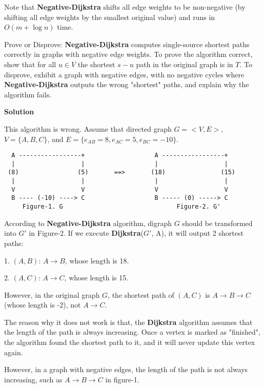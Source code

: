 \documentclass{article}
\newcounter{exercise}
\newcommand{\<}{
    \langle}
\renewcommand{\>}{
    \rangle}
\begin{document}
{\begin{exercise}
Note that \textbf{Negative-Dijkstra} shifts all edge weights to be non-negative
(by shifting all edge weights by the smallest original value) and runs in $O(m+\log n)$ time.

Prove or Disprove: \textbf{Negative-Dijkstra} computes single-source shortest paths correctly in graphs with negative edge weights. To prove the algorithm correct, show that for all $u\in V$ the shortest $s-u$ path in the original graph is in $T$. To disprove, exhibit a graph with negative edges, with no negative cycles where \textbf{Negative-Dijkstra} outputs the wrong "shortest" paths, and explain why the algorithm fails.
\end{exercise}

\bigskip
\noindent \textbf{Solution}

This algorithm is wrong. Assume that directed graph $G=<V, E>$, $V = \{A,B,C\}$, and $E = \{ e_{AB} = 8, e_{AC} = 5, e_{BC} = -10 \}$.

\begin{lstlisting}
  A -----------------+                   A -----------------+    
  |                  |                   |                  |
 (8)                (5)       ==>       (18)               (15)
  |                  |                   |                  |
  V                  V                   V                  V
  B ---- (-10) ----> C                   B ----- (0) -----> C
     Figure-1. G                               Figure-2. G'
\end{lstlisting}

According to \textbf{Negative-Dijkstra} algorithm, digraph $G$ should be transformed into $G'$ in Figure-2.
If we execute \textbf{Dijkstra}($G'$, A), it will output 2 shortest paths:

1. $(A, B)$: $A \rightarrow B$, whose length is 18.

2. $(A, C)$: $A \rightarrow C$, whose length is 15.

However, in the original graph $G$, the shortest path of $(A, C)$ is $A \rightarrow B \rightarrow C$ (whose length is -2), not $A \rightarrow C$.

The reason why it does not work is that, the \textbf{Dijkstra} algorithm assumes that the length of the path is always increasing. Once a vertex is marked as "finished", the algorithm found the shortest path to it, and it will never update this vertex again.

However, in a graph with negative edges, the length of the path is not always increasing, such as $A \rightarrow B \rightarrow C$ in figure-1.
\bigskip


}
\end{document}
